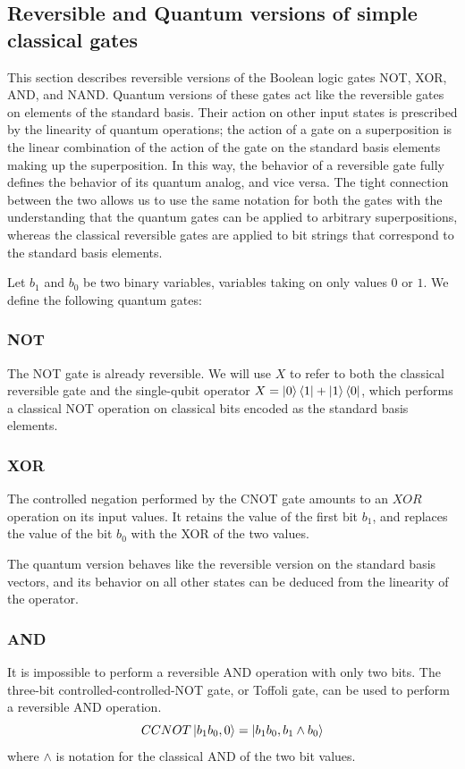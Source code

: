 \subsection{Reversible and Quantum versions of simple classical gates}
This section describes reversible versions of the Boolean logic gates NOT, XOR, AND, and NAND. Quantum versions of these gates act like the reversible gates on elements of the standard basis. Their action on other input states is prescribed by the linearity of quantum operations; the action of a gate on a superposition is the linear combination of the action of the gate on the standard basis elements making up the superposition. In this way, the behavior of a reversible gate fully defines the behavior of its quantum analog, and vice versa. The tight connection between the two allows us to use the same notation for both the gates with the understanding that the quantum gates can be applied to arbitrary superpositions, whereas the classical reversible gates are applied to bit strings that correspond to the standard basis elements.

Let $b_1$ and $b_0$ be two binary variables, variables taking on only values $0$ or $1$. We define the following quantum gates:

\subsubsection{NOT}
The NOT gate is already reversible. We will use $X$ to refer to both the classical reversible gate and the single-qubit operator $X=\ket{0}\bra{1}+\ket{1}\bra{0}$, which performs a classical NOT operation on classical bits encoded as the standard basis elements.

\subsubsection{XOR}
The controlled negation performed by the CNOT gate amounts to an $XOR$ operation on its input values. It retains the value of the first bit $b_1$, and replaces the value of the bit $b_0$ with the XOR of the two values.

The quantum version behaves like the reversible version on the standard basis vectors, and its behavior on all other states can be deduced from the linearity of the operator. 

\subsubsection{AND}
It is impossible to perform a reversible AND operation with only two bits. The three-bit controlled-controlled-NOT gate, or Toffoli gate, can be used to perform a reversible AND operation.
\[
CCNOT\ket{b_1b_0,0}=\ket{b_1b_0,b_1\land b_0}
\]
where $\land$ is notation for the classical AND of the two bit values.

